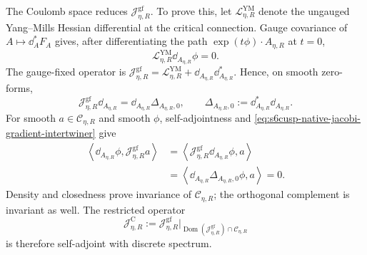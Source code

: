 The Coulomb space reduces \(\mathcal J^{\mathrm{gf}}_{\eta,R}\).  To prove
this, let \(\mathcal L^{\mathrm{YM}}_{\eta,R}\) denote the ungauged
Yang--Mills Hessian differential at the critical connection.  Gauge
covariance of
\(A\mapsto\dd_A^*F_A\) gives, after differentiating the path
\(\exp(t\phi)\cdot A_{\eta,R}\) at \(t=0\),
\begin{equation}\label{eq:s6cusp-native-gauge-orbit-hessian-zero}
 \mathcal L^{\mathrm{YM}}_{\eta,R}\dd_{A_{\eta,R}}\phi=0.
\end{equation}
The gauge-fixed operator is
\(\mathcal J^{\mathrm{gf}}_{\eta,R}
=\mathcal L^{\mathrm{YM}}_{\eta,R}
 +\dd_{A_{\eta,R}}\dd_{A_{\eta,R}}^*\).
Hence, on smooth zero-forms,
\begin{equation}\label{eq:s6cusp-native-jacobi-gradient-intertwiner}
 \mathcal J^{\mathrm{gf}}_{\eta,R}\dd_{A_{\eta,R}}
 =\dd_{A_{\eta,R}}\Delta_{A_{\eta,R},0},
 \qquad
 \Delta_{A_{\eta,R},0}:=
 \dd_{A_{\eta,R}}^*\dd_{A_{\eta,R}}.
\end{equation}
For smooth \(a\in\mathscr C_{\eta,R}\) and smooth \(\phi\), self-adjointness
and \eqref{eq:s6cusp-native-jacobi-gradient-intertwiner} give
\begin{align*}
 \left\langle \dd_{A_{\eta,R}}\phi,
 \mathcal J^{\mathrm{gf}}_{\eta,R}a\right\rangle
 &=\left\langle
 \mathcal J^{\mathrm{gf}}_{\eta,R}\dd_{A_{\eta,R}}\phi,a
 \right\rangle\\
 &=\left\langle
 \dd_{A_{\eta,R}}\Delta_{A_{\eta,R},0}\phi,a
 \right\rangle=0.
\end{align*}
Density and closedness prove invariance of \(\mathscr C_{\eta,R}\); the
orthogonal complement is invariant as well.  The restricted operator
\begin{equation}\label{eq:s6cusp-native-Coulomb-Jacobi}
 \mathcal J^{\mathrm C}_{\eta,R}:=
 \mathcal J^{\mathrm{gf}}_{\eta,R}\big|_{
 \operatorname{Dom}(\mathcal J^{\mathrm{gf}}_{\eta,R})
 \cap\mathscr C_{\eta,R}}
\end{equation}
is therefore self-adjoint with discrete spectrum.

